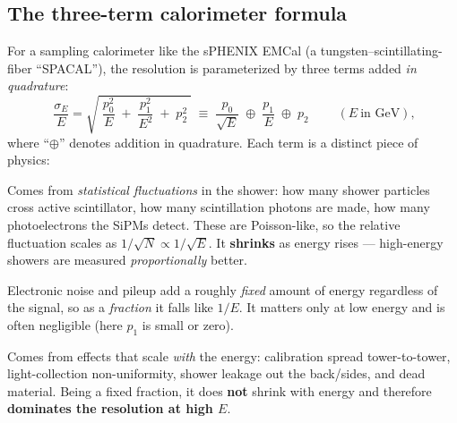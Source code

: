 \documentclass[11pt]{article}
\newcommand{\quadsum}{\;\oplus\;}
\begin{document}
\subsection{The three-term calorimeter formula}
For a sampling calorimeter like the sPHENIX EMCal (a tungsten--scintillating-fiber
``SPACAL''), the resolution is parameterized by three terms added \emph{in
quadrature}:
\begin{equation}
  \boxed{\;\frac{\sigma_E}{E}
   = \sqrt{\;\frac{p_0^2}{E}\;+\;\frac{p_1^2}{E^2}\;+\;p_2^2\;}
   \;\equiv\; \frac{p_0}{\sqrt{E}}\quadsum\frac{p_1}{E}\quadsum p_2\;}
  \qquad (E\ \text{in GeV}),
  \label{eq:reso}
\end{equation}
where ``$\oplus$'' denotes addition in quadrature. Each term is a distinct piece
of physics:
\begin{description}[leftmargin=2.2em]
  \item[\;$p_0/\sqrt{E}$ --- stochastic (sampling) term.] Comes from
        \emph{statistical fluctuations} in the shower: how many shower particles
        cross active scintillator, how many scintillation photons are made, how
        many photoelectrons the SiPMs detect. These are Poisson-like, so the
        relative fluctuation scales as $1/\sqrt{N}\propto 1/\sqrt{E}$. It
        \textbf{shrinks} as energy rises --- high-energy showers are measured
        \emph{proportionally} better.
  \item[\;$p_1/E$ --- noise term.] Electronic noise and pileup add a roughly
        \emph{fixed} amount of energy regardless of the signal, so as a
        \emph{fraction} it falls like $1/E$. It matters only at low energy and is
        often negligible (here $p_1$ is small or zero).
  \item[\;$p_2$ --- constant term.] Comes from effects that scale \emph{with}
        the energy: calibration spread tower-to-tower, light-collection
        non-uniformity, shower leakage out the back/sides, and dead material.
        Being a fixed fraction, it does \textbf{not} shrink with energy and
        therefore \textbf{dominates the resolution at high $E$}.
\end{description}
\end{document}
